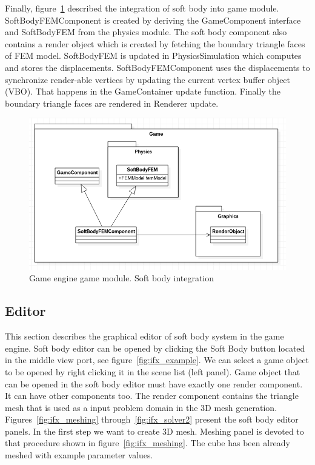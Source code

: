 \documentclass[en]{minipw} %
\begin{document}
Finally, figure~\ref{fig:ifx_game2} described the integration of soft body into game module. SoftBodyFEMComponent is created by deriving the GameComponent interface and SoftBodyFEM from the physics module. The soft body component also contains a render object which is created by fetching the boundary triangle faces of FEM model. SoftBodyFEM is updated in PhysicsSimulation which computes and stores the displacements. SoftBodyFEMComponent uses the displacements to synchronize render-able vertices by updating the current vertex buffer object (VBO). That happens in the GameContainer update function. Finally the boundary triangle faces are rendered in Renderer update.

\begin{figure}[h!]
\centering
\includegraphics[scale=0.5]{pictures/ifx_game2.png}
\caption[Game engine game module. Soft body integration]{Game engine game module. Soft body integration}
\label{fig:ifx_game2}
\end{figure}


\subsection{Editor}
This section describes the graphical editor of soft body system in the game engine. Soft body editor can be opened by clicking the Soft Body button located in the middle view port, see figure~\ref{fig:ifx_example}. We can select a game object to be opened by right clicking it in the scene list (left panel). Game object that can be opened in the soft body editor must have exactly one render component. It can have other components too. The render component contains the triangle mesh that is used as a input problem domain in the 3D mesh generation. Figures~\ref{fig:ifx_meshing} through~\ref{fig:ifx_solver2} present the soft body editor panels. In the first step we want to create 3D mesh. Meshing panel is devoted to that procedure shown in figure~\ref{fig:ifx_meshing}. The cube has been already meshed with example parameter values.
\end{document}
